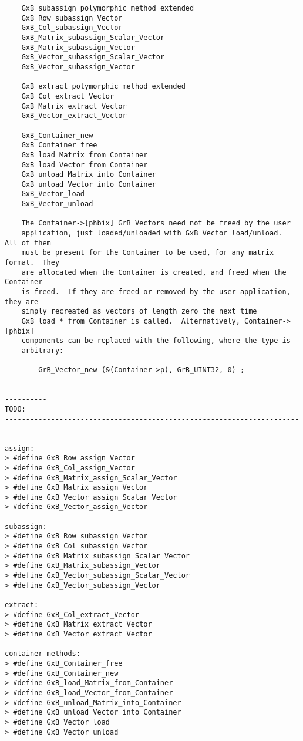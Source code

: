 \begin{verbatim}
    GxB_subassign polymorphic method extended
    GxB_Row_subassign_Vector
    GxB_Col_subassign_Vector
    GxB_Matrix_subassign_Scalar_Vector
    GxB_Matrix_subassign_Vector
    GxB_Vector_subassign_Scalar_Vector
    GxB_Vector_subassign_Vector

    GxB_extract polymorphic method extended
    GxB_Col_extract_Vector
    GxB_Matrix_extract_Vector
    GxB_Vector_extract_Vector

    GxB_Container_new
    GxB_Container_free
    GxB_load_Matrix_from_Container
    GxB_load_Vector_from_Container
    GxB_unload_Matrix_into_Container
    GxB_unload_Vector_into_Container
    GxB_Vector_load
    GxB_Vector_unload

    The Container->[phbix] GrB_Vectors need not be freed by the user
    application, just loaded/unloaded with GxB_Vector load/unload.  All of them
    must be present for the Container to be used, for any matrix format.  They
    are allocated when the Container is created, and freed when the Container
    is freed.  If they are freed or removed by the user application, they are
    simply recreated as vectors of length zero the next time
    GxB_load_*_from_Container is called.  Alternatively, Container->[phbix]
    components can be replaced with the following, where the type is
    arbitrary:

        GrB_Vector_new (&(Container->p), GrB_UINT32, 0) ;

--------------------------------------------------------------------------------
TODO:
--------------------------------------------------------------------------------

assign:
> #define GxB_Row_assign_Vector
> #define GxB_Col_assign_Vector
> #define GxB_Matrix_assign_Scalar_Vector
> #define GxB_Matrix_assign_Vector
> #define GxB_Vector_assign_Scalar_Vector
> #define GxB_Vector_assign_Vector

subassign:
> #define GxB_Row_subassign_Vector
> #define GxB_Col_subassign_Vector
> #define GxB_Matrix_subassign_Scalar_Vector
> #define GxB_Matrix_subassign_Vector
> #define GxB_Vector_subassign_Scalar_Vector
> #define GxB_Vector_subassign_Vector

extract:
> #define GxB_Col_extract_Vector
> #define GxB_Matrix_extract_Vector
> #define GxB_Vector_extract_Vector

container methods:
> #define GxB_Container_free
> #define GxB_Container_new
> #define GxB_load_Matrix_from_Container
> #define GxB_load_Vector_from_Container
> #define GxB_unload_Matrix_into_Container
> #define GxB_unload_Vector_into_Container
> #define GxB_Vector_load
> #define GxB_Vector_unload


\end{verbatim}
